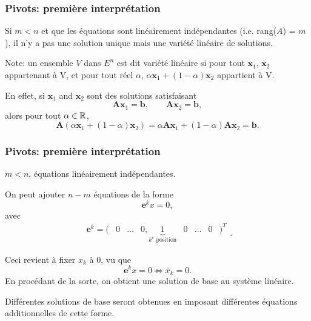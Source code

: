 \documentclass[t,usepdftitle=false]{beamer}
\def\bb{\boldsymbol{b}}
\def\be{\boldsymbol{e}}
\def\bx{\boldsymbol{x}}
\def\bA{\boldsymbol{A}}
\begin{document}
\begin{frame}
\frametitle{Pivots: première interprétation}

Si $m < n$ et que les équations sont linéairement indépendantes  (i.e. rang($A$) = $m$), il n'y a pas une solution unique mais une variété linéaire de solutions.

\mbox{}

Note: un ensemble $V$ dans $E^n$ est dit {\color{blue}variété linéaire} si pour tout $\bx_1$, $\bx_2$ appartenant à V, et pour tout réel $\alpha$, $\alpha \bx_1 + (1-\alpha)\bx_2$ appartient \`a V.

\mbox{}

En effet, si $\bx_1$ and $\bx_2$ sont des solutions satisfaisant
$$
\bA\bx_1 = \bb, \qquad \bA\bx_2 = \bb,
$$
alors pour tout $\alpha \in {\mathbb{R}}$,
$$
\bA(\alpha \bx_1 + (1-\alpha) \bx_2) = \alpha \bA\bx_1 + (1-\alpha) \bA\bx_2 = \bb.
$$

\end{frame}

\begin{frame}
\frametitle{Pivots: première interprétation}

$m < n$, équations linéairement indépendantes.

\mbox{}

On peut ajouter $n-m$ équations de la forme
\[
\be^k x = 0,
\]
avec
\[
 \begin{matrix} \be^k = ( & 0 & \ldots & 0, \underbrace{1}_{k^e \mbox{ position}} & 0 & \dots & 0 & )^T \end{matrix}.
\]

\mbox{}

Ceci revient à fixer $x_k$ à 0, vu que
\[
\be^k x = 0 \Leftrightarrow x_k = 0.
\]
En procédant de la sorte, on obtient une solution de base au système linéaire.

\mbox{}

Différentes solutions de base seront obtenues en imposant différentes équations additionnelles de cette forme.

\end{frame}
\end{document}

